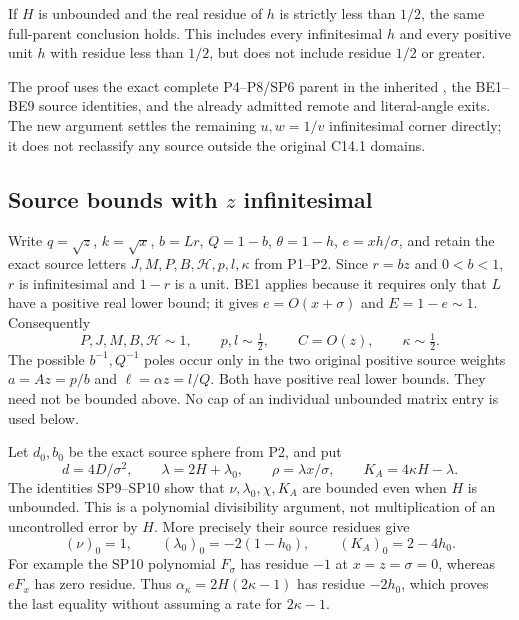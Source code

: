\begin{theorem}
If $H$ is unbounded and the real residue of $h$ is strictly less
than $1/2$, the same full-parent conclusion holds. This includes
every infinitesimal $h$ and every positive unit $h$ with residue
less than $1/2$, but does not include residue $1/2$ or greater.
\end{theorem}

The proof uses the exact complete P4--P8/SP6 parent in the inherited
, the BE1--BE9 source identities, and the
already admitted remote and literal-angle exits. The new argument
settles the remaining $u,w=1/v$ infinitesimal corner directly; it does
not reclassify any source outside the original C14.1 domains.

\subsection{Source bounds with $z$ infinitesimal}

Write $q=\sqrt z$, $k=\sqrt x$, $b=Lr$, $Q=1-b$,
$\theta=1-h$, $e=xh/\sigma$, and retain the exact source letters
$J,M,P,B,\mathcal H,p,l,\kappa$ from P1--P2. Since $r=bz$ and
$0<b<1$, $r$ is infinitesimal and $1-r$ is a unit. BE1 applies
because it requires only that $L$ have a positive real lower bound;
it gives $e=O(x+\sigma)$ and $E=1-e\sim1$. Consequently
\[
 P,J,M,B,\mathcal H\sim1,\qquad
 p,l\sim\tfrac12,\qquad C=O(z),\qquad\kappa\sim\tfrac12.
 \tag{SF1}
\]
The possible $b^{-1},Q^{-1}$ poles occur only in the two original
positive source weights $a=Az=p/b$ and $\ell=\alpha z=l/Q$.
Both have positive real lower bounds. They need not be bounded above.
No cap of an individual unbounded matrix entry is used below.

Let $d_0,b_0$ be the exact source sphere from P2, and put
\[
 d=4D/\sigma^2,\qquad
 \lambda=2H+\lambda_0,\qquad
 \rho=\lambda x/\sigma,\qquad
 K_A=4\kappa H-\lambda.
 \tag{SF2}
\]
The identities SP9--SP10 show that $\nu,\lambda_0,\chi,K_A$ are
bounded even when $H$ is unbounded. This is a polynomial
divisibility argument, not multiplication of an uncontrolled error
by $H$. More precisely their source residues give
\[
 (\nu)_0=1,\qquad (\lambda_0)_0=-2(1-h_0),\qquad
 (K_A)_0=2-4h_0.
 \tag{SF3}
\]
For example the SP10 polynomial $F_\sigma$ has residue $-1$ at
$x=z=\sigma=0$, whereas $eF_x$ has zero residue. Thus
$\alpha_\kappa=2H(2\kappa-1)$ has residue $-2h_0$, which proves
the last equality without assuming a rate for $2\kappa-1$.

